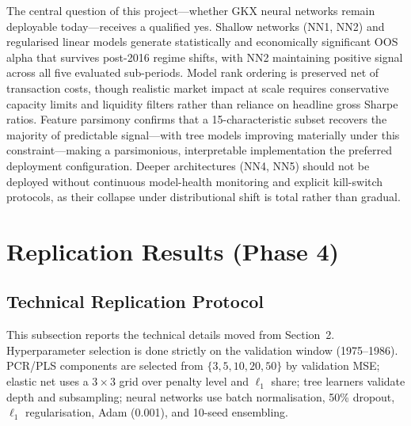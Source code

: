 \documentclass[11pt,a4paper]{article}
\begin{document}
The central question of this project---whether GKX neural networks remain deployable today---receives a qualified yes. Shallow networks (NN1, NN2) and regularised linear models generate statistically and economically significant OOS alpha that survives post-2016 regime shifts, with NN2 maintaining positive signal across all five evaluated sub-periods. Model rank ordering is preserved net of transaction costs, though realistic market impact at scale requires conservative capacity limits and liquidity filters rather than reliance on headline gross Sharpe ratios. Feature parsimony confirms that a 15-characteristic subset recovers the majority of predictable signal---with tree models improving materially under this constraint---making a parsimonious, interpretable implementation the preferred deployment configuration. Deeper architectures (NN4, NN5) should not be deployed without continuous model-health monitoring and explicit kill-switch protocols, as their collapse under distributional shift is total rather than gradual.

\clearpage
\appendix
\renewcommand{\thesection}{\Alph{section}}
\setcounter{section}{0}

\pagestyle{fancy}
\fancyhf{}
\cfoot{\thepage}

\section{Replication Results (Phase 4)}
\label{app:replication}

\subsection{Technical Replication Protocol}

\noindent\small This subsection reports the technical details moved from Section~2. Hyperparameter selection is done strictly on the validation window (1975--1986). PCR/PLS components are selected from $\{3,5,10,20,50\}$ by validation MSE; elastic net uses a $3\times 3$ grid over penalty level and $\ell_1$ share; tree learners validate depth and subsampling; neural networks use batch normalisation, 50\% dropout, $\ell_1$ regularisation, Adam (0.001), and 10-seed ensembling.
\end{document}
